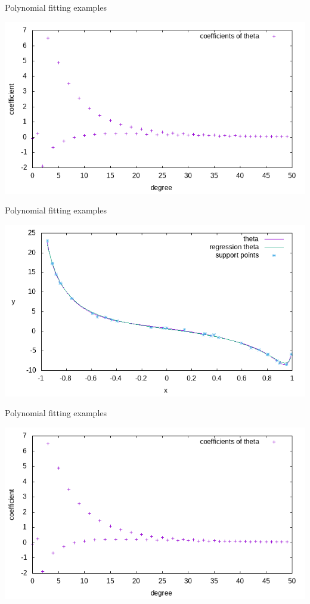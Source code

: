 \documentclass{beamer}
\begin{document}
\begin{frame}{Polynomial fitting examples}
\begin{center}
\includegraphics[width=\textwidth]{source/theta_coefficients_1.png}
\end{center}
\end{frame}

\begin{frame}{Polynomial fitting examples}
\begin{center}
\includegraphics[width=\textwidth]{source/theta_plot_2.png}
\end{center}
\end{frame}

\begin{frame}{Polynomial fitting examples}
\begin{center}
\includegraphics[width=\textwidth]{source/theta_coefficients_1.png}
\end{center}
\end{frame}
\end{document}
